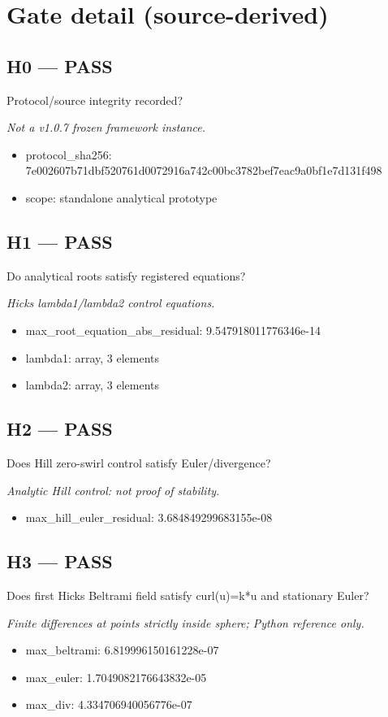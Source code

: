 \documentclass[10pt,a4paper]{article}
\begin{document}
\section*{Gate detail (source-derived)}
\subsection*{H0 --- PASS}
Protocol/source integrity recorded?
\par\textit{Not a v1.0.7 frozen framework instance.}\par
\begin{itemize}
\item protocol\_sha256: 7e002607b71dbf520761d0072916a742c00bc3782bef7eac9a0bf1e7d131f498
\item scope: standalone analytical prototype
\end{itemize}
\subsection*{H1 --- PASS}
Do analytical roots satisfy registered equations?
\par\textit{Hicks lambda1/lambda2 control equations.}\par
\begin{itemize}
\item max\_root\_equation\_abs\_residual: 9.547918011776346e-14
\item lambda1: array, 3 elements
\item lambda2: array, 3 elements
\end{itemize}
\subsection*{H2 --- PASS}
Does Hill zero-swirl control satisfy Euler/divergence?
\par\textit{Analytic Hill control: not proof of stability.}\par
\begin{itemize}
\item max\_hill\_euler\_residual: 3.684849299683155e-08
\end{itemize}
\subsection*{H3 --- PASS}
Does first Hicks Beltrami field satisfy curl(u)=k*u and stationary Euler?
\par\textit{Finite differences at points strictly inside sphere; Python reference only.}\par
\begin{itemize}
\item max\_beltrami: 6.819996150161228e-07
\item max\_euler: 1.7049082176643832e-05
\item max\_div: 4.334706940056776e-07
\end{itemize}
\end{document}
